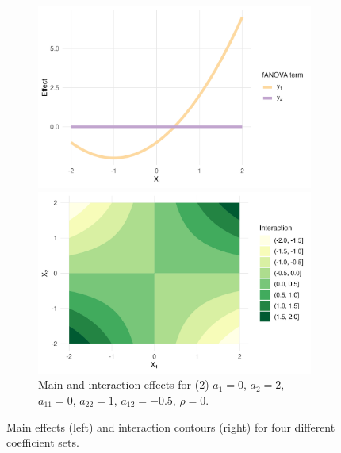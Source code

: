 \begin{figure}[htpb]
    \begin{subfigure}[t]{\textwidth}
        \centering
        \begin{minipage}[t]{0.49\textwidth}
            \includegraphics[width=\textwidth]{images/experiment_section/full_a1p20_a2p00_a11p10_a22p00_a12p05_rhop00_main.png}
        \end{minipage}%
        \hfill
        \begin{minipage}[t]{0.49\textwidth}
            \includegraphics[width=\textwidth]{images/experiment_section/full_a1p20_a2p00_a11p10_a22p00_a12p05_rhop00_interaction.png}
        \end{minipage}
        \caption{Main and interaction effects for (2) $a_1 = 0$, $a_2 = 2$, 
                 $a_{11} = 0$, $a_{22} = 1$, $a_{12} = -0.5$, $\rho = 0$.}
    \end{subfigure}
    \caption{Main effects (left) and interaction contours (right) for four different coefficient sets.}
    \label{fig:all_pair_01}
\end{figure}

